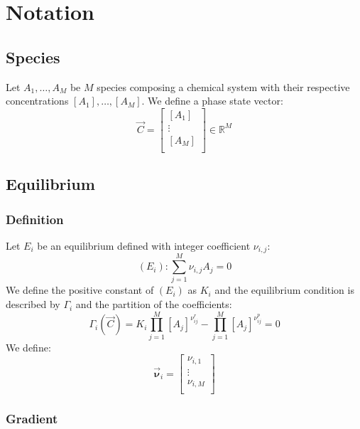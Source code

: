 \documentclass[aps,12pt]{revtex4}
\begin{document}
\section{Notation}

\subsection{Species}
Let $A_1,\dots,A_M$ be $M$ species composing a chemical system
with their respective concentrations $[A_1],\ldots,[A_M]$.
We define a phase state vector:
\begin{equation}
	\vec{C} = 
	\begin{bmatrix}
	[A_1]\\
	\vdots\\
	[A_M]\\
	\end{bmatrix}
	\in \mathbb{R}^M
\end{equation}

\subsection{Equilibrium}
\subsubsection{Definition}
Let $E_i$ be an equilibrium defined with integer coefficient $\nu_{i,j}$:
\begin{equation}
	(E_i) :  \sum_{j=1}^M \nu_{i,j} A_j = 0
\end{equation}
We define the positive constant of $(E_i)$ as $K_i$ and the
equilibrium condition is described by $\Gamma_i$ and the partition
of the coefficients:
\begin{equation}
	\Gamma_i(\vec{C}) = K_i \prod_{j=1}^{M} [A_j]^{\nu^r_{ij}} 
	- \prod_{j=1}^{M} [A_j]^{\nu^p_{ij}} = 0
\end{equation}
We define:
\begin{equation}
	\vec{\bm{\nu}}_i = 
	\begin{bmatrix}
	\nu_{i,1}\\
	\vdots\\
	\nu_{i,M}\\
	\end{bmatrix}
\end{equation}

\subsubsection{Gradient}
\end{document}
